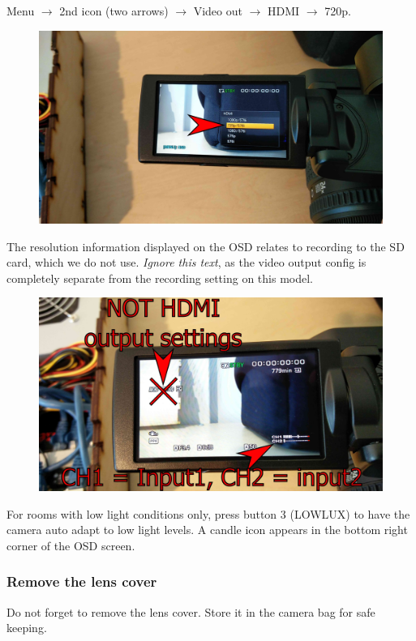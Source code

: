 \documentclass{article}
\begin{document}
Menu $\rightarrow$ 2nd icon (two arrows) $\rightarrow$ Video out $\rightarrow$ HDMI $\rightarrow$ 720p.
\begin{figure}[H]
  \centering
\includegraphics[width = 120mm]{Sony05.jpg}
\end{figure}

The resolution information displayed on the OSD relates to recording to the SD card, which we do not use. \emph{Ignore this text}, as the video output config is completely separate from the recording setting on this model.
\begin{figure}[H]
  \centering
\includegraphics[width = 120mm]{Sony06.jpg}
\end{figure}

For rooms with low light conditions only, press button 3 (LOWLUX) to have the camera auto adapt to low light levels. A candle icon appears in the bottom right corner of the OSD screen.

\subsubsection{Remove the lens cover}
Do not forget to remove the lens cover. Store it in the camera bag for safe keeping.
\end{document}
